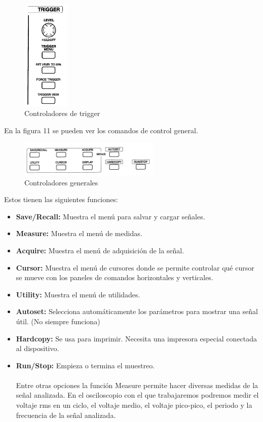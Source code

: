 \documentclass{scrartcl}
\begin{document}
\begin{figure}[h!]
	\centering
	\includegraphics[width=0.20\textwidth,height=0.35\textheight]{osc-trigger}
	\caption{Controladores de trigger}
\end{figure}

En la figura 11 se pueden ver los comandos de control general. \\

\begin{figure}[h!]
	\centering
	\includegraphics[width=0.60\textwidth,height=0.25\textheight]{osc-control}
	\caption{Controladores generales}
\end{figure}


Estos tienen las siguientes funciones:

\begin{itemize}
	\item \textbf{Save/Recall:} Muestra el menú para salvar y cargar señales.
	\item \textbf{Measure:} Muestra el menú de medidas.
	\item \textbf{Acquire:} Muestra el menú de adquisición de la señal.
	\item \textbf{Cursor:} Muestra el menú de cursores donde se permite controlar qué cursor se mueve con los paneles de comandos horizontales y verticales.
	\item \textbf{Utility:} Muestra el menú de utilidades.
	\item \textbf{Autoset:} Selecciona automáticamente los parámetros para mostrar una señal útil. (No siempre funciona)
	\item \textbf{Hardcopy:} Se usa para imprimir. Necesita una impresora especial conectada al dispositivo.
	\item \textbf{Run/Stop:} Empieza o termina el muestreo.\\
\\
Entre otras opciones la función Measure permite hacer diversas medidas de la señal analizada. En el osciloscopio con el que trabajaremos podremos medir el voltaje rms en un ciclo, el voltaje medio, el voltaje pico-pico, el periodo y la frecuencia de la señal analizada.

\end{itemize}
\end{document}
